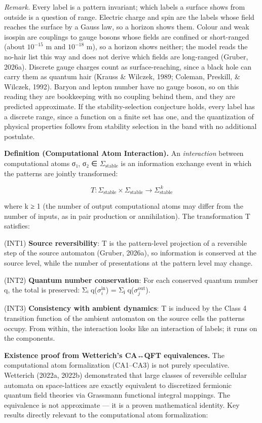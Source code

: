 \documentclass[
]{article}
\begin{document}
\emph{Remark.} Every label is a pattern invariant; which labels a
surface shows from outside is a question of range. Electric charge and
spin are the labels whose field reaches the surface by a Gauss law, so a
horizon shows them. Colour and weak isospin are couplings to gauge
bosons whose fields are confined or short-ranged (about \(10^{-15}\) m
and \(10^{-18}\) m), so a horizon shows neither; the model reads the
no-hair list this way and does not derive which fields are long-ranged
(Gruber, 2026a). Discrete gauge charges count as surface-reaching, since
a black hole can carry them as quantum hair (Krauss \& Wilczek, 1989;
Coleman, Preskill, \& Wilczek, 1992). Baryon and lepton number have no
gauge boson, so on this reading they are bookkeeping with no coupling
behind them, and they are predicted approximate. If the
stability-selection conjecture holds, every label has a discrete range,
since a function on a finite set has one, and the quantization of
physical properties follows from stability selection in the band with no
additional postulate.

\textbf{Definition (Computational Atom Interaction).} An
\emph{interaction} between computational atoms σ₁, σ₂ ∈
\(\Sigma_{\mathrm{stable}}\) is an information exchange event in which
the patterns are jointly transformed:

\[T: \Sigma_{\text{stable}} \times \Sigma_{\text{stable}} \to \Sigma_{\text{stable}}^{\,k}\]

where k ≥ 1 (the number of output computational atoms may differ from
the number of inputs, as in pair production or annihilation). The
transformation T satisfies:

(INT1) \textbf{Source reversibility}: T is the pattern-level projection
of a reversible step of the source automaton (Gruber, 2026a), so
information is conserved at the source level, while the number of
presentations at the pattern level may change.

(INT2) \textbf{Quantum number conservation}: For each conserved quantum
number q, the total is preserved: Σᵢ q(\(\sigma_i^{\text{in}}\)) = Σⱼ
q(\(\sigma_j^{\text{out}}\)).

(INT3) \textbf{Consistency with ambient dynamics}: T is induced by the
Class 4 transition function of the ambient automaton on the source cells
the patterns occupy. From within, the interaction looks like an
interaction of labels; it runs on the components.

\textbf{Existence proof from Wetterich's CA↔QFT equivalences.} The
computational atom formalization (CA1--CA3) is not purely speculative.
Wetterich (2022a, 2022b) demonstrated that large classes of reversible
cellular automata on space-lattices are exactly equivalent to
discretized fermionic quantum field theories via Grassmann functional
integral mappings. The equivalence is not approximate --- it is a proven
mathematical identity. Key results directly relevant to the
computational atom formalization:
\end{document}
